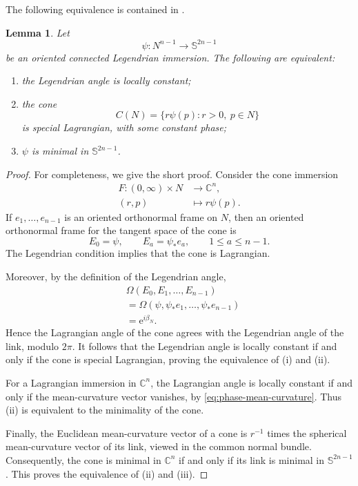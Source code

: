 \documentclass[11pt,a4paper]{article}
\numberwithin{equation}{section}
\newtheorem{lemma}[theorem]{Lemma}
\newcommand{\C}{\mathbb C}
\newcommand{\Sph}{\mathbb S}
\newcommand{\ee}{\mathrm e}
\begin{document}
The following equivalence is contained in
\cite[Section~2.2]{Haskins2004}.

\begin{lemma}\label{lem:legendrian-minimal-phase}
Let
$$
        \psi:N^{n-1}\longrightarrow\Sph^{2n-1}
$$
be an oriented connected Legendrian immersion.  The following are equivalent:
\begin{enumerate}[label=\rm(\roman*)]
\item the Legendrian angle is locally constant;
\item the cone
$$
        C(N)=\{r\psi(p):r>0,\ p\in N\}
$$
is special Lagrangian, with some constant phase;
\item $\psi$ is minimal in $\Sph^{2n-1}$.
\end{enumerate}
\end{lemma}

\begin{proof}
For completeness, we give the short proof.  Consider the cone immersion
\begin{equation*}
\begin{aligned}
        F:(0,\infty)\times N&\longrightarrow\C^n,\\
        (r,p)&\longmapsto r\psi(p).
\end{aligned}
\end{equation*}
If $e_1,\ldots,e_{n-1}$ is an oriented orthonormal frame on $N$, then
an oriented orthonormal frame for the tangent space of the cone is
$$
        E_0=\psi,
        \qquad
        E_a=\psi_*e_a,
        \qquad
        1\leq a\leq n-1.
$$
The Legendrian condition implies that the cone is Lagrangian.  

Moreover,
by the definition of the Legendrian angle,
$$
\begin{aligned}
        &\Omega(E_0,E_1,\ldots,E_{n-1})
        \\&=
        \Omega(\psi,\psi_*e_1,\ldots,\psi_*e_{n-1})\\
        &=
        \ee^{i\beta_N}.
\end{aligned}
$$
Hence the Lagrangian angle of the cone agrees with the Legendrian angle
of the link, modulo $2\pi$.  It follows that the Legendrian angle is
locally constant if and only if the cone is special Lagrangian, proving
the equivalence of \rm(i) and \rm(ii).

For a Lagrangian immersion in $\C^n$, the Lagrangian angle is locally
constant if and only if the mean-curvature vector vanishes, by
\eqref{eq:phase-mean-curvature}. Thus \rm(ii) is equivalent to the
minimality of the cone.

Finally, the Euclidean mean-curvature vector of a cone is $r^{-1}$ times
the spherical mean-curvature vector of its link, viewed in the common
normal bundle.  
Consequently, the cone is minimal in $\C^n$ if and only
if its link is minimal in $\Sph^{2n-1}$.  This proves the equivalence of \rm(ii) and \rm(iii).
\end{proof}
\end{document}
